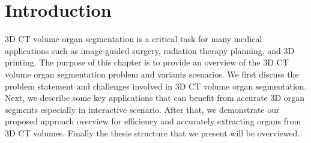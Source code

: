 \chapter{Introduction}
\label{chap-introduction}
\begin{ChapAbstract}



3D CT volume organ segmentation is a critical task for many medical applications such as image-guided surgery, radiation therapy planning, and 3D printing. The purpose of this chapter is to provide an overview of the 3D CT volume organ segmentation problem and variants scenarios. We first discuss the problem statement and challenges involved in 3D CT volume organ segmentation. Next, we describe some key applications that can benefit from accurate 3D organ segments especially in interactive scenario. After that, we demonstrate our proposed approach overview for efficiency and accurately extracting organs from 3D CT volumes. Finally the thesis structure that we present will be overviewed.

\end{ChapAbstract}


% 




